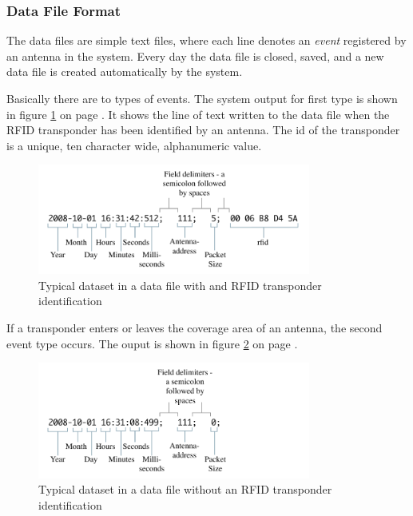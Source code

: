 \subsubsection{Data File Format}
\label{subsubsec:datafileformat}
The data files are simple text files, where each line denotes an \textit{event} registered by an antenna in the system. Every day the data file is closed, saved, and a new data file is created automatically by the system.

Basically there are to types of events. The system output for first type is shown in figure \ref{fig:dataset} on page \pageref{fig:dataset}. It shows the line of text written to the data file when the \ac{RFID} transponder has been identified by an antenna. The id of the transponder is a unique, ten character wide, alphanumeric value.

\begin{figure}[htbp]	
\centering	
\includegraphics[width=0.8\textwidth]{assets/pdf/dataset.pdf}	
\caption[Dataset with RFID transponder identification]{Typical dataset in a data file with and \ac{RFID} transponder identification}
\label{fig:dataset}
\end{figure}

If a transponder enters or leaves the coverage area of an antenna, the second event type occurs. The ouput is shown in figure \ref{fig:dataset_no_data} on page \pageref{fig:dataset_no_data}.

\begin{figure}[htbp]	
\centering	
\includegraphics[width=0.8\textwidth]{assets/pdf/dataset_no_data.pdf}	
\caption[Dataset without RFID transponder identification]{Typical dataset in a data file without an \ac{RFID} transponder identification}
\label{fig:dataset_no_data}
\end{figure}

